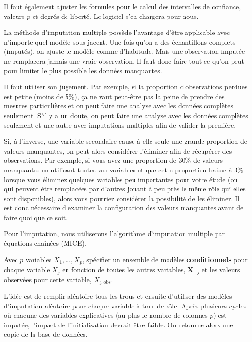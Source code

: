 \documentclass[
  11pt,
  letterpaper,
]{scrbook}
\theoremstyle{definition}
\theoremstyle{remark}
\begin{document}
Il faut également ajuster les formules pour le calcul des intervalles de
confiance, valeurs-\(p\) et degrés de liberté. Le logiciel s'en chargera
pour nous.

La méthode d'imputation multiple possède l'avantage d'être applicable
avec n'importe quel modèle sous-jacent. Une fois qu'on a des
échantillons complets (imputés), on ajuste le modèle comme d'habitude.
Mais une observation imputée ne remplacera jamais une vraie observation.
Il faut donc faire tout ce qu'on peut pour limiter le plus possible les
données manquantes.

Il faut utiliser son jugement. Par exemple, si la proportion
d'observations perdues est petite (moins de 5\%), ça ne vaut peut-être
pas la peine de prendre des mesures particulières et on peut faire une
analyse avec les données complètes seulement. S'il y a un doute, on peut
faire une analyse avec les données complètes seulement et une autre avec
imputations multiples afin de valider la première.

Si, à l'inverse, une variable secondaire cause à elle seule une grande
proportion de valeurs manquantes, on peut alors considérer l'éliminer
afin de récupérer des observations. Par exemple, si vous avez une
proportion de 30\% de valeurs manquantes en utilisant toutes vos
variables et que cette proportion baisse à 3\% lorsque vous éliminez
quelques variables peu importantes pour votre étude (ou qui peuvent être
remplacées par d'autres jouant à peu près le même rôle qui elles sont
disponibles), alors vous pourriez considérer la possibilité de les
éliminer. Il est donc nécessaire d'examiner la configuration des valeurs
manquantes avant de faire quoi que ce soit.

Pour l'imputation, nous utiliserons l'algorithme d'imputation multiple
par équations chaînées (MICE).

Avec \(p\) variables \(X_1, \ldots, X_p\), spécifier un ensemble de
modèles \textbf{conditionnels} pour chaque variable \(X_j\) en fonction
de toutes les autres variables, \(\boldsymbol{X}_{-j}\) et les valeurs
observées pour cette variable, \(X_{j, \text{obs}}\).

L'idée est de remplir aléatoire tous les trous et ensuite d'utiliser des
modèles d'imputation aléatoire pour chaque variable à tour de rôle.
Après plusieurs cycles où chacune des variables explicatives (au plus le
nombre de colonnes \(p\)) est imputée, l'impact de l'initialisation
devrait être faible. On retourne alors une copie de la base de données.
\end{document}

